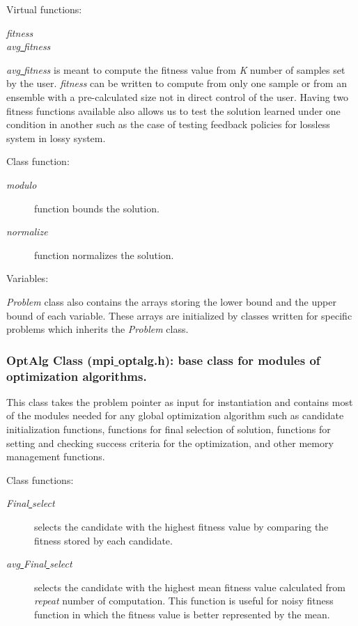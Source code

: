 \documentclass[12pt,letterpaper]{article}
\begin{document}
        Virtual functions:
 		
 		\begin{description}
 		\item[\textit{fitness}]
 		\item[\textit{avg\underline{ }fitness}]
 		\end{description}
 
            \textit{avg\underline{ }fitness} is meant to compute the fitness value from \textit{K} number of samples set by the user. \textit{fitness} can be written to compute from only one sample or from an ensemble with a pre-calculated size not in direct control of the user. 
            Having two fitness functions available also allows us to test the solution learned under one condition in another such as the case of testing feedback policies for lossless system in lossy system.
       
       \noindent Class function:
       \begin{description}
       \item[\textit{modulo}] function bounds the solution.
       \item[\textit{normalize}] function normalizes the solution.
       \end{description}
       
        \noindent Variables:
        
        \textit{Problem} class also contains the arrays storing the lower bound and the upper bound of each variable. 
        These arrays are initialized by classes written for specific problems which inherits the \textit{Problem} class.   

\subsubsection{OptAlg Class (mpi\underline{ }optalg.h): base class for modules of optimization algorithms.}

This class takes the problem pointer as input for instantiation and contains most of the modules needed for any global optimization algorithm such as candidate initialization functions, functions for final selection of solution, functions for setting and checking success criteria for the optimization, and other memory management functions.
 
       \noindent Class functions:
        
        \begin{description}
        \item[\textit{Final\underline{ }select}] selects the candidate with the highest fitness value by comparing the fitness stored by each candidate.
        \item[\textit{avg\underline{ }Final\underline{ }select}] selects the candidate with the highest mean fitness value calculated from \textit{repeat} number of computation. This function is useful for noisy fitness function in which the fitness value is better represented by the mean.
        \end{description}
 
\end{document}
